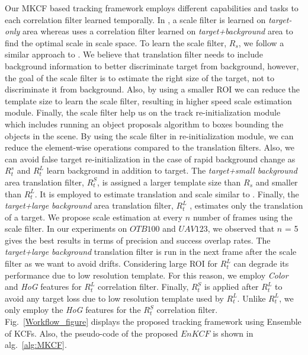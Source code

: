 \documentclass[10pt,twocolumn,letterpaper]{article}
\newcounter{ct}
\begin{document}
Our MKCF based tracking framework employs different capabilities and
tasks to each correlation filter learned temporally. In
\cite{ma2015long, danelljan2014accurate}, a scale filter is learned on
\textit{target-only} area whereas \cite{henriques2015high,
  li2014scale, bibi2015multi, tang2015multi} uses a correlation filter
learned on \textit{target+background} area to find the optimal scale
in scale space. To learn the scale filter, $R_{s}$, we follow a
similar approach to \cite{ma2015long}. We believe that translation
filter needs to include background information to better discriminate
target from background, however, the goal of the scale filter is to
estimate the right size of the target, not to discriminate it from
background. Also, by using a smaller ROI we can reduce the template size
 to learn the scale filter, resulting in higher speed scale
estimation module. Finally, the scale filter help us on the track
re-initialization module which includes running an object proposals
algorithm to boxes bounding the objects in the scene. By using the
scale filter in re-initialization module, we can reduce the
element-wise operations compared to the translation filters. Also, we can 
avoid false target re-initialization in the case of rapid background change as $R_{t}^{s}$ and
$R_{t}^{L}$ learn background in addition to target. The \textit{target+small background} area translation filter, $R_{t}^{S}$,
is assigned a larger template size than $R_{s}$ and smaller than
$R_{t}^{L}$. It is employed to estimate translation and scale similar
to \cite{henriques2015high}. Finally, the \textit{target+large
  background} area translation filter, $R_{t}^{L}$ , estimates only
the translation of a target. We propose scale estimation at every $n$ number of frames using the scale filter. In our experiments on $OTB100$ and $UAV123$,
we observed that $n$ = 5 gives the best results in terms of precision and success overlap rates. The \textit{target+large background} translation filter is run
in the next frame after the scale filter as we want to avoid drifts. Considering large ROI for $R_{t}^{L}$ can degrade its performance due to low resolution template. For this reason, we employ \textit{Color} and \textit{HoG} features for $R_{t}^{L}$ correlation filter. Finally, $R_{t}^{S}$ is applied after $R_{t}^{L}$ to avoid any target loss due to low resolution template used by $R_{t}^{L}$. Unlike $R_{t}^{L}$, we only employ the \textit{HoG} features for the $R_{t}^{S}$ correlation filter. Fig.~\ref{Workflow_figure} displays the proposed tracking framework using Ensemble of KCFs. Also, the pseudo-code of the proposed $EnKCF$ is shown in alg.~\ref{alg:MKCF}.
\end{document}
